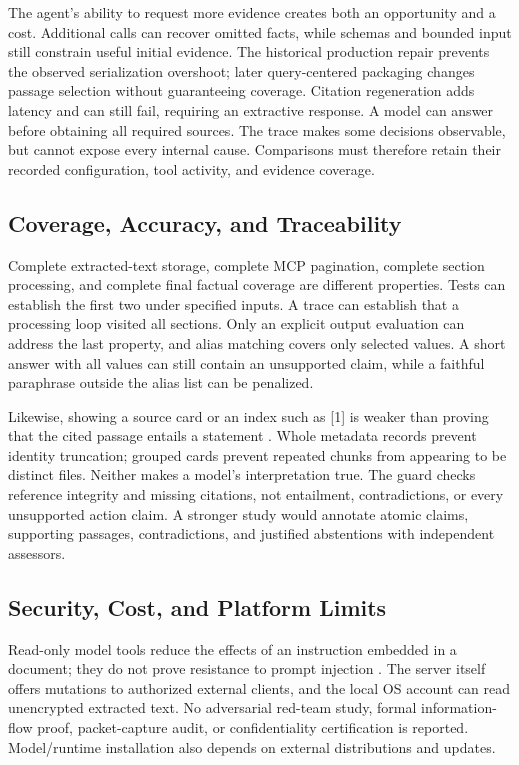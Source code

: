 \documentclass[conference,letterpaper]{IEEEtran}
\begin{document}
The agent's ability to request more evidence creates both an opportunity and a cost. Additional calls can recover omitted facts, while schemas and bounded input still constrain useful initial evidence. The historical production repair prevents the observed serialization overshoot; later query-centered packaging changes passage selection without guaranteeing coverage. Citation regeneration adds latency and can still fail, requiring an extractive response. A model can answer before obtaining all required sources. The trace makes some decisions observable, but cannot expose every internal cause. Comparisons must therefore retain their recorded configuration, tool activity, and evidence coverage.

\subsection{Coverage, Accuracy, and Traceability}
Complete extracted-text storage, complete MCP pagination, complete section processing, and complete final factual coverage are different properties. Tests can establish the first two under specified inputs. A trace can establish that a processing loop visited all sections. Only an explicit output evaluation can address the last property, and alias matching covers only selected values. A short answer with all values can still contain an unsupported claim, while a faithful paraphrase outside the alias list can be penalized.

Likewise, showing a source card or an index such as [1] is weaker than proving that the cited passage entails a statement \cite{alce}. Whole metadata records prevent identity truncation; grouped cards prevent repeated chunks from appearing to be distinct files. Neither makes a model's interpretation true. The guard checks reference integrity and missing citations, not entailment, contradictions, or every unsupported action claim. A stronger study would annotate atomic claims, supporting passages, contradictions, and justified abstentions with independent assessors.

\subsection{Security, Cost, and Platform Limits}
Read-only model tools reduce the effects of an instruction embedded in a document; they do not prove resistance to prompt injection \cite{injection}. The server itself offers mutations to authorized external clients, and the local OS account can read unencrypted extracted text. No adversarial red-team study, formal information-flow proof, packet-capture audit, or confidentiality certification is reported. Model/runtime installation also depends on external distributions and updates.
\end{document}
